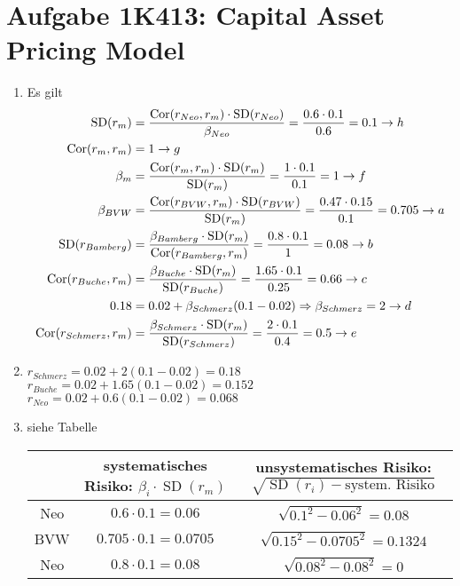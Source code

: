 \documentclass{article}
\DeclareMathOperator{\SD}{SD}
\DeclareMathOperator{\Cor}{Cor}
\begin{document}
	\section*{Aufgabe 1K413: Capital Asset Pricing Model}
	\begin{enumerate}[label=(\alph*)]
		\item Es gilt
		\begin{align}
			\SD(r_m) &= \frac{\Cor(r_{Neo},r_m)\cdot \SD(r_{Neo})}{\beta_{Neo}} = \frac{0.6\cdot 0.1}{0.6} = 0.1 \to h \notag \\
			\Cor(r_m,r_m) &= 1 \to g \notag \\
			\beta_m &= \frac{\Cor(r_m,r_m)\cdot \SD(r_m)}{\SD(r_m)} = \frac{1\cdot 0.1}{0.1} = 1 \to f \notag \\
			\beta_{BVW} &=  \frac{\Cor(r_{BVW},r_m)\cdot \SD(r_{BVW})}{\SD(r_m)} = \frac{0.47\cdot 0.15}{0.1} = 0.705\to a \notag \\
			\SD(r_{Bamberg}) &= \frac{\beta_{Bamberg}\cdot \SD(r_m)}{\Cor(r_{Bamberg},r_m)} = \frac{0.8\cdot 0.1}{1} = 0.08 \to b \notag \\
			\Cor(r_{Buche}, r_m) &= \frac{\beta_{Buche}\cdot \SD(r_m)}{\SD(r_{Buche})} = \frac{1.65\cdot 0.1}{0.25} = 0.66\to c \notag \\
			0.18 &= 0.02 + \beta_{Schmerz}(0.1-0.02) \Rightarrow \beta_{Schmerz} = 2\to d \notag \\
			\Cor(r_{Schmerz},r_m) &= \frac{\beta_{Schmerz}\cdot \SD(r_m)}{\SD(r_{Schmerz})} = \frac{2\cdot 0.1}{0.4} = 0.5\to e \notag
		\end{align}
		\item $r_{Schmerz} = 0.02 + 2(0.1-0.02) = 0.18$ \\
		$r_{Buche} = 0.02 + 1.65(0.1-0.02) = 0.152$ \\
		$r_{Neo} = 0.02 + 0.6(0.1-0.02) = 0.068$
		\item siehe Tabelle
		\begin{center}
			\begin{tabular}{c|c|c}
				& \textbf{systematisches Risiko: $\beta_i\cdot \SD(r_m)$} & \textbf{unsystematisches Risiko:} $\sqrt{\SD(r_i) - \text{system. Risiko}}$ \\
				\hline
				Neo & $0.6\cdot 0.1=0.06$ & $\sqrt{0.1^2 - 0.06^2}=0.08$ \\
				BVW & $0.705\cdot 0.1=0.0705$ & $\sqrt{0.15^2 - 0.0705^2}=0.1324$ \\
				Neo & $0.8\cdot 0.1=0.08$ & $\sqrt{0.08^2 - 0.08^2}=0$
			\end{tabular}
		\end{center}

\end{enumerate}
\end{document}
